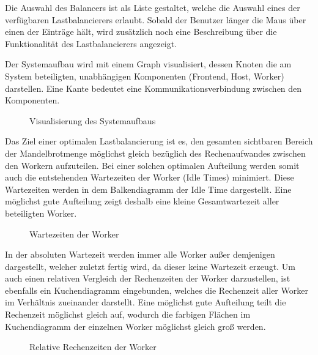 Die Auswahl des Balancers ist als Liste gestaltet, welche die Auswahl eines der verfügbaren Lastbalancierers erlaubt. Sobald der Benutzer länger die Maus über einen der Einträge hält, wird zusätzlich noch eine Beschreibung über die Funktionalität des Lastbalancierers angezeigt.

Der Systemaufbau wird mit einem Graph visualisiert, dessen Knoten die am System beteiligten, unabhängigen Komponenten (Frontend, Host, Worker) darstellen. Eine Kante bedeutet eine Kommunikationsverbindung zwischen den Komponenten. 

\begin{figure}
    \centering
        \caption{Visualisierung des Systemaufbaus}
    \label{fig:visualisierung_systemaufbau}
\end{figure}

Das Ziel einer optimalen Lastbalancierung ist es, den gesamten sichtbaren Bereich der Mandelbrotmenge möglichst gleich bezüglich des Rechenaufwandes zwischen den Workern aufzuteilen. Bei einer solchen optimalen Aufteilung werden somit auch die entstehenden Wartezeiten der Worker (Idle Times) minimiert. Diese Wartezeiten werden in dem Balkendiagramm der Idle Time dargestellt. Eine möglichst gute Aufteilung zeigt deshalb eine kleine Gesamtwartezeit aller beteiligten Worker.

\begin{figure}
    \centering
        \caption{Wartezeiten der Worker}
    \label{fig:visualisierung_wartezeiten_worker}
\end{figure}

In der absoluten Wartezeit werden immer alle Worker außer demjenigen dargestellt, welcher zuletzt fertig wird, da dieser keine Wartezeit erzeugt. Um auch einen relativen Vergleich der Rechenzeiten der Worker darzustellen, ist ebenfalls ein Kuchendiagramm eingebunden, welches die Rechenzeit aller Worker im Verhältnis zueinander darstellt. Eine möglichst gute Aufteilung teilt die Rechenzeit möglichst gleich auf, wodurch die farbigen Flächen im Kuchendiagramm der einzelnen Worker möglichst gleich groß werden.

\begin{figure}
    \centering
        \caption{Relative Rechenzeiten der Worker}
    \label{fig:visualisierung_relative_rechenzeiten_worker}
\end{figure}

